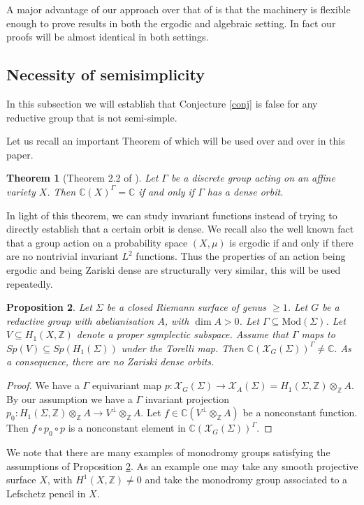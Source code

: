 \documentclass{article}
\newcommand{\XX}{\mathcal{X}}
\newcommand{\ZZ}{ \mathbb{Z}}
\newcommand{\CC}{\mathbb{C}}
\newcommand{\Mod}{\textrm{Mod}}
\newtheorem{theorem}{Theorem}[section]
\newtheorem{proposition}[theorem]{Proposition}
\begin{document}
A major advantage of our approach over that of \cite{KPS} is that the machinery is flexible enough to prove results in both the ergodic and algebraic setting. In fact our proofs will be almost identical in both settings.
\subsection{Necessity of semisimplicity}\label{ssnec}
In this subsection we will establish that Conjecture \ref{conj} is false for any reductive group that is not semi-simple.

Let us recall an important Theorem of \cite{KPS} which will be used over and over in this paper.
\begin{theorem}[Theorem 2.2 of \cite{KPS}]
    Let $\Gamma$ be a discrete group acting on an affine variety $X$. Then 
    $\CC(X)^{\Gamma} = \CC$ if and only if $\Gamma$ has a dense orbit.
\end{theorem}

In light of this theorem, we can study invariant functions instead of trying to directly establish that a certain orbit is dense.
We recall also the well known fact that a group action on a probability space $(X, \mu)$ is ergodic if and only if there are no nontrivial invariant $L^2$ functions. Thus the properties of an action being ergodic and being Zariski dense are structurally very similar, this will be used repeatedly.

\begin{proposition}\label{notreductive}
Let $\Sigma$ be a closed Riemann surface of genus $\ge 1$. Let $G$ be a reductive group with abelianisation $A$, with $\dim A >0$. Let $\Gamma \subseteq \Mod(\Sigma)$. Let $V \subseteq H_1(X,\ZZ)$ denote a proper symplectic subspace. Assume that $\Gamma$ maps to $Sp(V) \subseteq Sp(H_1(\Sigma))$ under the Torelli map. Then $\CC(\XX_G(\Sigma))^{\Gamma} \neq \CC.$ As a consequence, there are no Zariski dense orbits.
\end{proposition}
\begin{proof}
    We have a $\Gamma$ equivariant map $p :\XX_G(\Sigma) \to \XX_A(\Sigma)= H_1(\Sigma, \ZZ) \otimes_{\ZZ} A.$ By our assumption we have a $\Gamma$ invariant projection $p_0:H_1(\Sigma, \ZZ)\otimes_{\ZZ} A \to V^{\perp} \otimes_{\ZZ} A.$ Let  $f \in \CC(V^{\perp} \otimes_{\ZZ} A)$ be a nonconstant function. Then $f \circ p_0 \circ p$  is a nonconstant element in $\CC(\XX_G(\Sigma))^{\Gamma}.$
\end{proof}
We note that there are many examples of monodromy groups satisfying the assumptions of Proposition \ref{notreductive}. As an example one may take any smooth projective surface $X$, with $H^1(X,\ZZ) \neq 0$ and take the monodromy group associated to a Lefschetz pencil in $X$.
 
\end{document}
